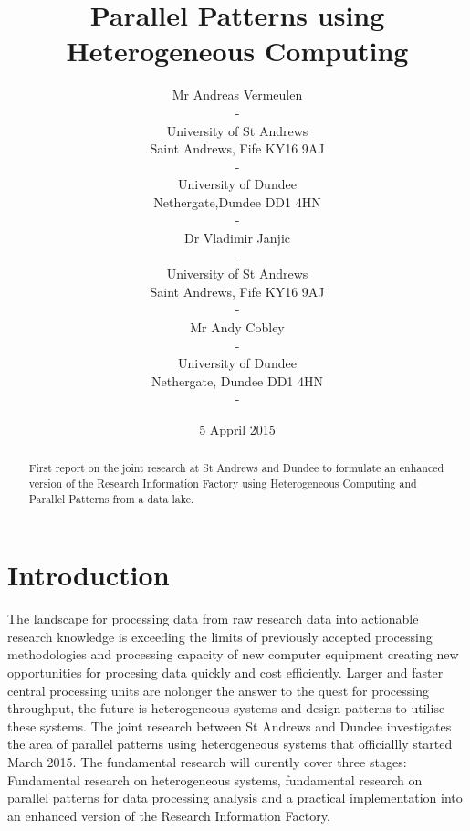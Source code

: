 \documentclass{acm_proc_article-sp}
\begin{document}
\title{Parallel Patterns using Heterogeneous Computing}
\subtitle{}
\author{
\alignauthor
Mr Andreas Vermeulen\\
\affaddr -\\
\affaddr University of St Andrews\\
\affaddr Saint Andrews, Fife KY16 9AJ\\
\affaddr -\\
\affaddr University of Dundee\\
\affaddr Nethergate,Dundee DD1 4HN\\
\affaddr -\\
\alignauthor
Dr Vladimir Janjic\\
\affaddr -\\
\affaddr University of St Andrews\\
\affaddr Saint Andrews, Fife KY16 9AJ\\
\affaddr -\\
\alignauthor
Mr Andy Cobley\\
\affaddr -\\
\affaddr University of Dundee\\
\affaddr Nethergate, Dundee DD1 4HN\\
\affaddr -\\
}
\date{5 Appril 2015}
\maketitle
\begin{abstract}
First report on the joint research at St Andrews and Dundee to formulate an enhanced version of the Research Information Factory using Heterogeneous Computing and Parallel Patterns from a data lake.
\end{abstract}
\section{Introduction}
The landscape for processing data from raw research data into actionable research knowledge is exceeding the limits of previously accepted processing methodologies and processing capacity of new computer equipment creating new opportunities for procesing data quickly and cost efficiently. Larger and faster central processing units are nolonger the answer to the quest for processing throughput, the future is heterogeneous systems and design patterns to utilise these systems. The joint research between St Andrews and Dundee investigates the area of parallel patterns using heterogeneous systems that officiallly started March 2015. The fundamental research will curently cover three stages:
Fundamental research on heterogeneous systems, fundamental research on parallel patterns for data processing analysis and a practical implementation into an enhanced version of the Research Information Factory. 
\end{document}
